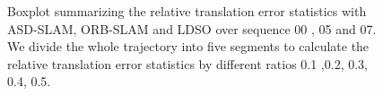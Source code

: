 \documentclass[letterpaper, 10 pt, conference]{ieeeconf}  %
\begin{document}
\begin{figure}[H]
\flushleft 
{}%
%

%
%

\caption{Boxplot summarizing the relative translation error statistics with ASD-SLAM, ORB-SLAM and LDSO over sequence 00 , 05 and 07. We divide the whole trajectory into five segments to  calculate the relative translation error statistics by different ratios 0.1 ,0.2, 0.3, 0.4, 0.5. } 
\end{figure}
\end{document}
